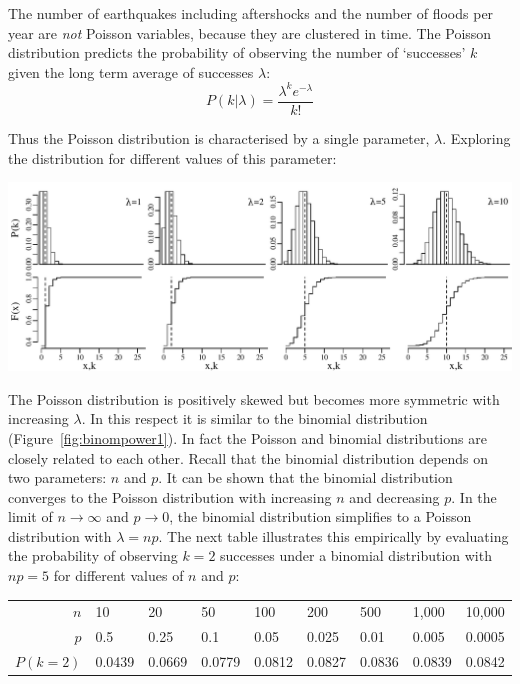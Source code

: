 The number of earthquakes including aftershocks and the number of
floods per year are \emph{not} Poisson variables, because they are
clustered in time. The Poisson distribution predicts the probability
of observing the number of `successes' $k$ given the long term average
of successes $\lambda$:
\begin{equation}
  P(k|\lambda) = \frac{\lambda^k e^{-\lambda}}{k!}
  \label{eq:poispmf}
\end{equation}

Thus the Poisson distribution is characterised by a single parameter,
$\lambda$. Exploring the distribution for different values of this
parameter:\medskip

\noindent\includegraphics[]{../figures/increasinglambda.pdf}
\begingroup {} \endgroup

The Poisson distribution is positively skewed but becomes more
symmetric with increasing $\lambda$. In this respect it is similar to
the binomial distribution (Figure~\ref{fig:binompower1}). In fact the
Poisson and binomial distributions are closely related to each
other. Recall that the binomial distribution depends on two
parameters: $n$ and $p$. It can be shown that the binomial
distribution converges to the Poisson distribution with increasing $n$
and decreasing $p$. In the limit of $n \rightarrow \infty$ and $p
\rightarrow 0$, the binomial distribution simplifies to a Poisson
distribution with $\lambda = {n}{p}$. The next table illustrates this
empirically by evaluating the probability of observing $k=2$
successes under a binomial distribution with $np=5$ for different
values of $n$ and $p$:

\begin{center}
\begin{tabular}{r|llllllll}
$n$ & 10  & 20   & 50  & 100  & 200   & 500  & 1,000 & 10,000\\
$p$ & 0.5 & 0.25 & 0.1 & 0.05 & 0.025 & 0.01 & 0.005 & 0.0005\\
$P(k=2)$ & 0.0439 & 0.0669 & 0.0779 & 0.0812 & 0.0827 & 0.0836 & 0.0839 & 0.0842
\end{tabular}
\end{center}

